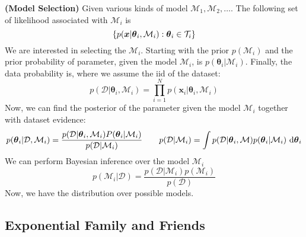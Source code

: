 \begin{remark}{\textbf{(Model Selection)}}
    Given various kinds of model $\mathcal{M}_1,\mathcal{M}_2,\dots$. The following set of likelihood associated with $\mathcal{M}_i$ is
    \begin{equation*}
        \left\{ p(\boldsymbol x | \boldsymbol \theta_i, \mathcal{M}_i) : \boldsymbol \theta_i\in\mathcal{T}_i \right\}
    \end{equation*}
    We are interested in selecting the $\mathcal{M}_i$. Starting with the prior $p(\mathcal{M}_i)$ and the prior probability of parameter, given the model $\mathcal{M}_i$, is $p(\boldsymbol \theta_i|\mathcal{M}_i)$. Finally, the data probability is, where we assume the iid of the dataset:
    \begin{equation*}
        p(\mathcal{D}|\boldsymbol \theta_i, \mathcal{M}_i) = \prod^N_{i=1} p(\boldsymbol x_i | \boldsymbol \theta_i, \mathcal{M}_i) 
    \end{equation*}
    Now, we can find the posterior of the parameter given the model $\mathcal{M}_i$ together with dataset evidence:
    \begin{equation*}
       p(\boldsymbol \theta_i | \mathcal{D}, \mathcal{M}_i) = \frac{p(\mathcal{D} | \boldsymbol \theta_i, \mathcal{M}_i)P(\boldsymbol \theta_i|\mathcal{M}_i)}{p(\mathcal{D}|\mathcal{M}_i)} \qquad p(\mathcal{D}|\mathcal{M}_i) = \int p(\mathcal{D}|\boldsymbol \theta_i,\mathcal{M})p(\boldsymbol \theta_i | \mathcal{M}_i)\ \mathrm{d}\boldsymbol \theta_i
    \end{equation*}
    We can perform Bayesian inference over the model $\mathcal{M}_i$
    \begin{equation*}
        p(\mathcal{M}_i|\mathcal{D}) = \frac{p(\mathcal{D} | \mathcal{M}_i)p(\mathcal{M}_i)}{p(\mathcal{D})}
    \end{equation*}
    Now, we have the distribution over possible models. 
\end{remark}

\subsection{Exponential Family and Friends}

